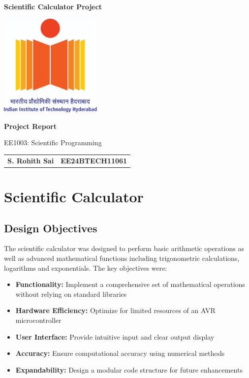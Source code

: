 \documentclass[12pt]{article}
\begin{document}
\begin{titlepage}
    \centering
    {\Huge \bfseries  Scientific Calculator Project \par}
    \vspace{1cm}
    \includegraphics[width=5cm]{figs/logo.jpg} %
    \vspace{1cm}
    
    {\Large \bfseries Project Report \par}
    \vspace{0.5cm}
    
    {\large EE1003: Scientific Programming \par}
    \vspace{2cm}
    \begin{tabular}{ll}
    \textbf{S. Rohith Sai} & \textbf{EE24BTECH11061}  \end{tabular}
\vspace{1cm}
\end{titlepage}
\newpage
\tableofcontents
\newpage

\section{Scientific Calculator}
\subsection{Design Objectives}
The scientific calculator was designed to perform basic arithmetic operations as well as advanced mathematical functions including trigonometric calculations, logarithms and exponentials. The key objectives were:

\begin{itemize}
    \item \textbf{Functionality:} Implement a comprehensive set of mathematical operations without relying on standard libraries
    \item \textbf{Hardware Efficiency:} Optimize for limited resources of an AVR microcontroller
    \item \textbf{User Interface:} Provide intuitive input and clear output display
    \item \textbf{Accuracy:} Ensure computational accuracy using numerical methods
    \item \textbf{Expandability:} Design a modular code structure for future enhancements
\end{itemize}
\end{document}
